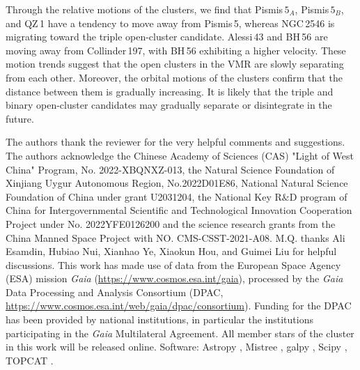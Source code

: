 \documentclass{aa} %
\begin{document}
Through the relative motions of the clusters, we find that Pismis\,$5_{A}$, Pismis\,$5_{B}$, and QZ\,1 have 
a tendency to move away from Pismis\,5, whereas NGC\,2546 is migrating toward the triple open-cluster candidate.
Alessi\,43 and BH\,56 are moving away from Collinder\,197, with BH\,56 exhibiting a higher velocity. These motion trends suggest that the open clusters in the VMR are slowly separating from each other. Moreover, the orbital motions of the clusters confirm that the distance between them is gradually increasing. It is likely that the triple and binary open-cluster candidates may gradually separate or disintegrate in the future.
\begin{acknowledgements} 
The authors thank the reviewer for the very helpful comments and suggestions.
The authors acknowledge the Chinese Academy of Sciences (CAS) "Light of West China" Program, No. 2022-XBQNXZ-013, the Natural Science Foundation of Xinjiang Uygur Autonomous Region, No.2022D01E86,  National Natural Science Foundation of China under grant U2031204, the National Key R$\&$D program of China for Intergovernmental Scientific and Technological Innovation Cooperation Project under No. 2022YFE0126200
and the science research grants from the China Manned Space Project with NO. CMS-CSST-2021-A08.
M.Q. thanks Ali Esamdin, Hubiao Nui, Xianhao Ye, Xiaokun Hou, and Guimei Liu for helpful discussions.
This work has made use of data from the European Space Agency (ESA) mission
{\it Gaia} (\url{https://www.cosmos.esa.int/gaia}), processed by the {\it Gaia}
Data Processing and Analysis Consortium (DPAC,
\url{https://www.cosmos.esa.int/web/gaia/dpac/consortium}). Funding for the DPAC
has been provided by national institutions, in particular the institutions
participating in the {\it Gaia} Multilateral Agreement. All member stars of the cluster in this work will be released online.
Software: Astropy \citep{2013A&A...558A..33A,2018AJ....156..123A}, Mistree \citep{2019JOSS....4.1721N},
galpy \citep{2015ApJS..216...29B}, Scipy \citep{2020NatMe..17..261V}, TOPCAT \citep{tayl05}.

\end{acknowledgements}
\end{document}
